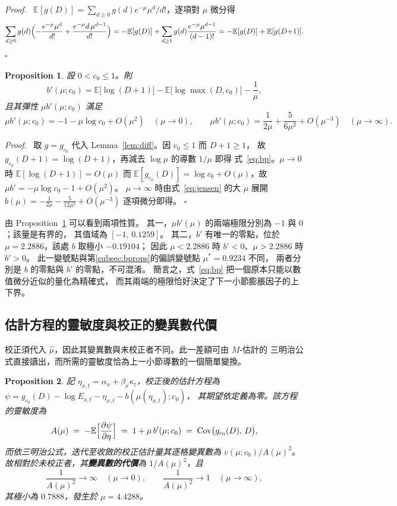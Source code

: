 \documentclass[UTF8, fontset=macnew, a4paper, 12pt]{ctexart}
\newtheorem{prop}{Proposition}
\newenvironment{proof}{\par\noindent\textit{Proof}.\ }{\hfill$\square$\par\vspace{4pt}}
\newcommand{\Ex}{\mathbb{E}}
\begin{document}
\begin{proof}
$\Ex[g(D)]=\sum_{d\ge0}g(d)e^{-\mu}\mu^{d}/d!$，逐項對 $\mu$ 微分得
\[
\sum_{d\ge0}g(d)\Bigl(-\frac{e^{-\mu}\mu^{d}}{d!}
+\frac{e^{-\mu}d\,\mu^{d-1}}{d!}\Bigr)
=-\Ex[g(D)]+\sum_{d\ge1}g(d)\frac{e^{-\mu}\mu^{d-1}}{(d-1)!}
=-\Ex[g(D)]+\Ex[g(D{+}1)].
\]
\end{proof}

\begin{prop}\label{prop:bp}
設 $0<c_0\le1$。則
\begin{equation}\label{eq:bp}
b'(\mu;c_0)=\Ex\bigl[\log(D{+}1)\bigr]-\Ex\bigl[\log\max(D,c_0)\bigr]-\frac{1}{\mu},
\end{equation}
且其彈性 $\mu b'(\mu;c_0)$ 滿足
\[
\mu b'(\mu;c_0)=-1-\mu\log c_0+O(\mu^2)\quad(\mu\to0),\qquad
\mu b'(\mu;c_0)=\frac{1}{2\mu}+\frac{5}{6\mu^{2}}+O(\mu^{-3})\quad(\mu\to\infty).
\]
\end{prop}

\begin{proof}
取 $g=g_{c_0}$ 代入 Lemma~\ref{lem:diff}。因 $c_0\le1$ 而 $D+1\ge1$，
故 $g_{c_0}(D{+}1)=\log(D{+}1)$，再減去 $\log\mu$ 的導數 $1/\mu$ 即得
式~\eqref{eq:bp}。$\mu\to0$ 時 $\Ex[\log(D{+}1)]=O(\mu)$ 而
$\Ex[g_{c_0}(D)]=\log c_0+O(\mu)$，故 $\mu b'=-\mu\log c_0-1+O(\mu^2)$。
$\mu\to\infty$ 時由式~\eqref{eq:jensen} 的大 $\mu$ 展開
$b(\mu)=-\frac{1}{2\mu}-\frac{5}{12\mu^{2}}+O(\mu^{-3})$ 逐項微分即得。
\end{proof}

由 Proposition~\ref{prop:bp} 可以看到兩項性質。
其一，$\mu b'(\mu)$ 的兩端極限分別為 $-1$ 與 $0$；該量是有界的，
其值域為 $[-1,\,0.1259]$。
其二，$b'$ 有唯一的零點，位於 $\mu=2.2886$，該處 $b$ 取極小 $-0.19104$；
因此 $\mu<2.2886$ 時 $b'<0$、$\mu>2.2886$ 時 $b'>0$。
此一變號點與第\ref{subsec:bprops}的偏誤變號點 $\mu^{\ast}=0.9234$ 不同，
兩者分別是 $b$ 的零點與 $b'$ 的零點，不可混淆。
簡言之，式~\eqref{eq:bp} 把一個原本只能以數值微分近似的量化為精確式，
而其兩端的極限恰好決定了下一小節膨脹因子的上下界。

\subsection{估計方程的靈敏度與校正的變異數代價}\label{subsec:inflate}

校正須代入 $\hat\mu$，因此其變異數與未校正者不同。此一差額可由 $M$-估計的
三明治公式直接讀出，而所需的靈敏度恰為上一小節導數的一個簡單變換。

\begin{prop}\label{prop:infl}
記 $\eta_{x,t}=\alpha_x+\beta_x\kappa_t$，校正後的估計方程為
$\psi=g_{c_0}(D)-\log E_{x,t}-\eta_{x,t}-b(\mu(\eta_{x,t});c_0)$，
其期望依定義為零。該方程的靈敏度為
\begin{equation}\label{eq:sensA}
A(\mu)\;=\;-\Ex\Bigl[\frac{\partial\psi}{\partial\eta}\Bigr]
\;=\;1+\mu\,b'(\mu;c_0)\;=\;\mathrm{Cov}\bigl(g_{c_0}(D),\,D\bigr),
\end{equation}
而依三明治公式，迭代至收斂的校正估計量其逐格變異數為 $v(\mu;c_0)/A(\mu)^2$。
故相對於未校正者，其\textbf{變異數的代價}為 $1/A(\mu)^2$，且
\[
\frac{1}{A(\mu)^2}\to\infty\quad(\mu\to0),\qquad
\frac{1}{A(\mu)^2}\to1\quad(\mu\to\infty),
\]
其極小為 $0.7888$，發生於 $\mu=4.4288$。
\end{prop}
\end{document}
